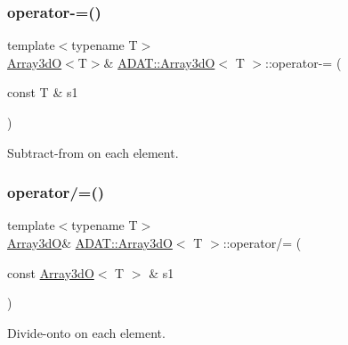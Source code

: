 \subsubsection{\texorpdfstring{operator-\/=()}{operator-=()}\hspace{0.1cm}{\footnotesize\ttfamily [4/4]}}
{\footnotesize\ttfamily template$<$typename T$>$ \\
\mbox{\hyperlink{classADAT_1_1Array3dO}{Array3dO}}$<$T$>$\& \mbox{\hyperlink{classADAT_1_1Array3dO}{A\+D\+A\+T\+::\+Array3dO}}$<$ T $>$\+::operator-\/= (\begin{DoxyParamCaption}\item[{const T \&}]{s1 }\end{DoxyParamCaption})\hspace{0.3cm}{\ttfamily [inline]}}



Subtract-\/from on each element. 

\mbox{\label{classADAT_1_1Array3dO_a634dcf5154efc0a7496d50f4f258978d}} 
\subsubsection{\texorpdfstring{operator/=()}{operator/=()}\hspace{0.1cm}{\footnotesize\ttfamily [1/4]}}
{\footnotesize\ttfamily template$<$typename T$>$ \\
\mbox{\hyperlink{classADAT_1_1Array3dO}{Array3dO}}\& \mbox{\hyperlink{classADAT_1_1Array3dO}{A\+D\+A\+T\+::\+Array3dO}}$<$ T $>$\+::operator/= (\begin{DoxyParamCaption}\item[{const \mbox{\hyperlink{classADAT_1_1Array3dO}{Array3dO}}$<$ T $>$ \&}]{s1 }\end{DoxyParamCaption})\hspace{0.3cm}{\ttfamily [inline]}}



Divide-\/onto on each element. 

\mbox{\label{classADAT_1_1Array3dO_a634dcf5154efc0a7496d50f4f258978d}} 
